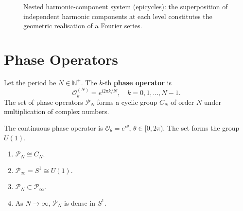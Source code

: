 \begin{figure}[htbp]
\centering
{}
\caption{Nested harmonic-component system (epicycles): the superposition of independent harmonic components at each level constitutes the geometric realisation of a Fourier series.}
\label{fig:nested_harmonic}
\end{figure}

\section{Phase Operators}

\begin{definition}\label{def:discrete_phase_operator}
Let the period be $N \in \mathbb{N}^+$. The $k$-th \textbf{phase operator} is
\[
\mathcal{O}_k^{(N)} = e^{i 2\pi k / N}, \quad k = 0, 1, \dots, N-1.
\]
The set of phase operators $\mathcal{P}_N$ forms a cyclic group $C_N$ of order $N$ under multiplication of complex numbers.
\end{definition}

\begin{definition}\label{def:continuous_phase_operator}
The continuous phase operator is $\mathcal{O}_\theta = e^{i\theta}$, $\theta \in [0, 2\pi)$. The set forms the group $U(1)$.
\end{definition}

\begin{proposition}\label{prop:phase_operator_group}
\begin{enumerate}[label=(\roman*)]
    \item $\mathcal{P}_N \cong C_N$.
    \item $\mathcal{P}_\infty = S^1 \cong U(1)$.
    \item $\mathcal{P}_N \subset \mathcal{P}_\infty$.
    \item As $N \to \infty$, $\mathcal{P}_N$ is dense in $S^1$.
\end{enumerate}
\end{proposition}

